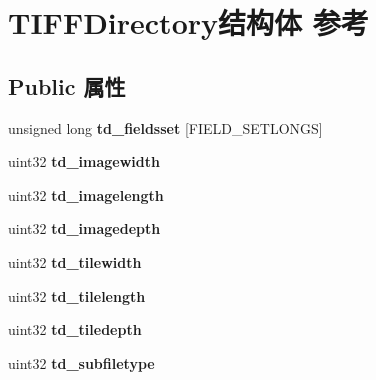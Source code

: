 \hypertarget{struct_t_i_f_f_directory}{}\section{T\+I\+F\+F\+Directory结构体 参考}
\label{struct_t_i_f_f_directory}
\subsection*{Public 属性}
\begin{DoxyCompactItemize}
\item 
\mbox{\label{struct_t_i_f_f_directory_ad8655629b5b19cd4ec03760ba806c969}} 
unsigned long {\bfseries td\+\_\+fieldsset} \mbox{[}F\+I\+E\+L\+D\+\_\+\+S\+E\+T\+L\+O\+N\+GS\mbox{]}
\item 
\mbox{\label{struct_t_i_f_f_directory_a47eb23a4294cfb63c53414cf1aaa6584}} 
uint32 {\bfseries td\+\_\+imagewidth}
\item 
\mbox{\label{struct_t_i_f_f_directory_ad842c57c160689e8aa7b558118b58d59}} 
uint32 {\bfseries td\+\_\+imagelength}
\item 
\mbox{\label{struct_t_i_f_f_directory_a1a2656d03ce3abaf438034f1970fa6bc}} 
uint32 {\bfseries td\+\_\+imagedepth}
\item 
\mbox{\label{struct_t_i_f_f_directory_ad346ec07b04cfbeb45cd21e5d757d9e4}} 
uint32 {\bfseries td\+\_\+tilewidth}
\item 
\mbox{\label{struct_t_i_f_f_directory_a8d256b9d94ceddac9a4a19cc262e2a5f}} 
uint32 {\bfseries td\+\_\+tilelength}
\item 
\mbox{\label{struct_t_i_f_f_directory_a56500bcb0eda0658399e965aef25f86e}} 
uint32 {\bfseries td\+\_\+tiledepth}
\item 
\mbox{\label{struct_t_i_f_f_directory_a630e7c3b391191c5a492213b7235dca3}} 
uint32 {\bfseries td\+\_\+subfiletype}
\item 
\mbox{\label{struct_t_i_f_f_directory_a33ef758d01cb93cadac9c22fa286cb76}} 

\end{DoxyCompactItemize}
